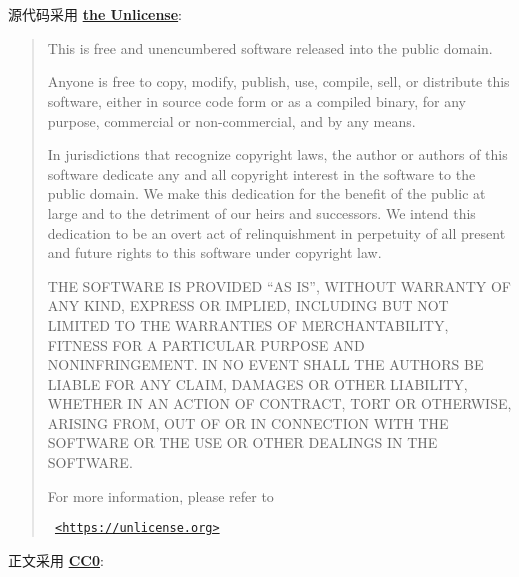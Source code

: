 \section*{\LicenseNotice}

源代码采用 \hyperref{https://unlicense.org/}{}{}{\textbf{the Unlicense}}:

\begin{quotation}
    \sffamily

    This is free and unencumbered software released into the public domain.

    Anyone is free to copy, modify, publish, use, compile, sell, or distribute this software, either in source code form or as a compiled binary, for any purpose, commercial or non-commercial, and by any means.

    In jurisdictions that recognize copyright laws, the author or authors of this software dedicate any and all copyright interest in the software to the public domain. We make this dedication for the benefit of the public at large and to the detriment of our heirs and successors. We intend this dedication to be an overt act of relinquishment in perpetuity of all present and future rights to this software under copyright law.

    THE SOFTWARE IS PROVIDED ``AS IS'', WITHOUT WARRANTY OF ANY KIND, EXPRESS OR IMPLIED, INCLUDING BUT NOT LIMITED TO THE WARRANTIES OF MERCHANTABILITY, FITNESS FOR A PARTICULAR PURPOSE AND NONINFRINGEMENT. IN NO EVENT SHALL THE AUTHORS BE LIABLE FOR ANY CLAIM, DAMAGES OR OTHER LIABILITY, WHETHER IN AN ACTION OF CONTRACT, TORT OR OTHERWISE, ARISING FROM, OUT OF OR IN CONNECTION WITH THE SOFTWARE OR THE USE OR OTHER DEALINGS IN THE SOFTWARE.

    For more information, please refer to
    \begin{center}
        \texttt{ \hyperref{https://unlicense.org}{}{}{<https://unlicense.org>} }
    \end{center}
\end{quotation}

正文采用 \hyperref{https://creativecommons.org/publicdomain/zero/1.0/}{}{}{\textbf{CC0}}:


